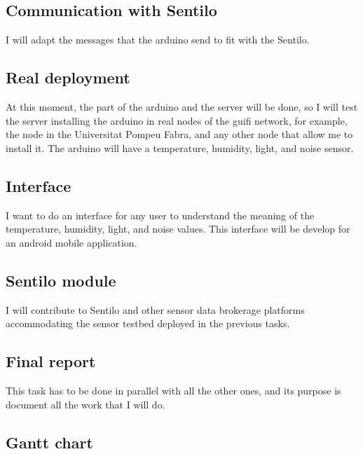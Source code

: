 \subsection{Communication with Sentilo}

I will adapt the messages that the arduino send to fit with the Sentilo.

\subsection{Real deployment}

At this moment, the part of the arduino and the server will be done, so I will test the server installing the arduino in real nodes of the guifi network, for example, the node in the Universitat Pompeu Fabra, and any other node that allow me to install it. The arduino will have a temperature, humidity, light, and noise sensor.

\subsection{Interface}

I want to do an interface for any user to understand the meaning of the temperature, humidity, light, and noise values. This interface will be develop for an android mobile application.

\subsection{Sentilo module}

I will contribute to Sentilo and other sensor data brokerage platforms accommodating the sensor testbed deployed in the previous tasks.

\subsection{Final report}

This task has to be done in parallel with all the other ones, and its purpose is document all the work that I will do.

\subsection{Gantt chart}

